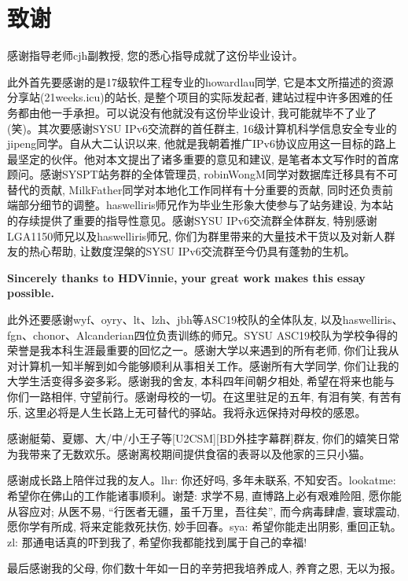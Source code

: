 
\chapter{致谢}

感谢指导老师cjh副教授, 您的悉心指导成就了这份毕业设计。

此外首先要感谢的是17级软件工程专业的howardlau同学, 它是本文所描述的资源分享站(21weeks.icu)的站长, 是整个项目的实际发起者, 建站过程中许多困难的任务都由他一手承担。可以说没有他就没有这份毕业设计, 我可能就毕不了业了(笑)。其次要感谢SYSU IPv6交流群的首任群主, 16级计算机科学信息安全专业的jipeng同学。自从大二认识以来, 他就是我朝着推广IPv6协议应用这一目标的路上最坚定的伙伴。他对本文提出了诸多重要的意见和建议, 是笔者本文写作时的首席顾问。感谢SYSPT站务群的全体管理员, robinWongM同学对数据库迁移具有不可替代的贡献, MilkFather同学对本地化工作同样有十分重要的贡献, 同时还负责前端部分细节的调整。haswelliris师兄作为毕业生形象大使参与了站务建设, 为本站的存续提供了重要的指导性意见。感谢SYSU IPv6交流群全体群友, 特别感谢LGA1150师兄以及haswelliris师兄, 你们为群里带来的大量技术干货以及对新人群友的热心帮助, 让数度涅槃的SYSU IPv6交流群至今仍具有蓬勃的生机。

\textbf{Sincerely thanks to HDVinnie, your great work makes this essay possible.}

此外还要感谢wyf、oyry、lt、lzh、jbh等ASC19校队的全体队友, 以及haswelliris、fgn、chonor、Alcanderian四位负责训练的师兄。SYSU ASC19校队为学校争得的荣誉是我本科生涯最重要的回忆之一。感谢大学以来遇到的所有老师, 你们让我从对计算机一知半解到如今能够顺利从事相关工作。感谢所有大学同学, 你们让我的大学生活变得多姿多彩。感谢我的舍友, 本科四年间朝夕相处, 希望在将来也能与你们一路相伴, 守望前行。感谢母校的一切。在这里驻足的五年, 有泪有笑, 有苦有乐, 这里必将是人生长路上无可替代的驿站。我将永远保持对母校的感恩。

感谢艇菊、夏娜、大/中/小王子等[U2CSM][BD外挂字幕群]群友, 你们的嬉笑日常为我带来了无数欢乐。感谢离校期间提供食宿的表哥以及他家的三只小猫。

感谢成长路上陪伴过我的友人。lhr: 你还好吗, 多年未联系, 不知安否。lookatme: 希望你在佛山的工作能诸事顺利。谢楚: 求学不易, 直博路上必有艰难险阻, 愿你能从容应对; 从医不易, ``行医者无疆，虽千万里，吾往矣'', 而今病毒肆虐, 寰球震动, 愿你学有所成, 将来定能救死扶伤, 妙手回春。sya: 希望你能走出阴影, 重回正轨。zl: 那通电话真的吓到我了, 希望你我都能找到属于自己的幸福!

最后感谢我的父母, 你们数十年如一日的辛劳把我培养成人, 养育之恩, 无以为报。
